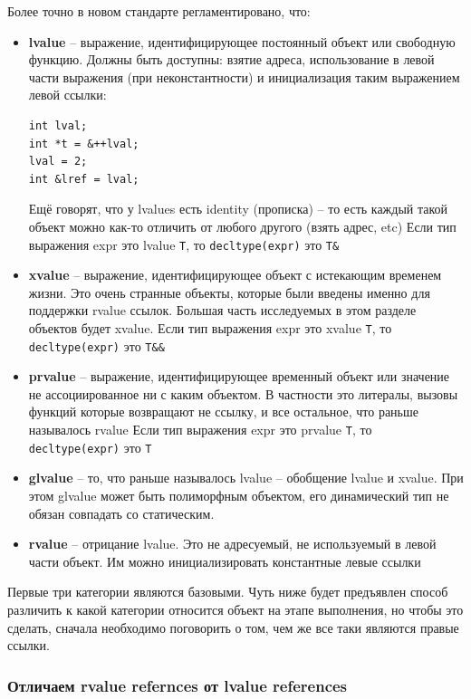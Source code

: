 \documentclass[a4paper,12pt,oneside]{article}
\begin{document}
Более точно в новом стандарте регламентировано, что:

\begin{itemize}
\item \textbf{lvalue} -- выражение, идентифицирующее постоянный объект или свободную функцию. Должны быть доступны: взятие адреса, использование в левой части выражения (при неконстантности) и инициализация таким выражением левой ссылки:
\begin{lstlisting}
int lval;
int *t = &++lval;
lval = 2;
int &lref = lval;
\end{lstlisting}
Ещё говорят, что у lvalues есть identity (прописка) -- то есть каждый такой объект можно как-то отличить от любого другого (взять адрес, etc)
Если тип выражения expr это lvalue \lstinline!T!, то \lstinline!decltype(expr)! это \lstinline!T&!
\item \textbf{xvalue} -- выражение, идентифицирующее объект с истекающим временем жизни. Это очень странные объекты, которые были введены именно для поддержки rvalue ссылок. Большая часть исследуемых в этом разделе объектов будет xvalue.
Если тип выражения expr это xvalue \lstinline!T!, то \lstinline!decltype(expr)! это \lstinline!T&&!
\item \textbf{prvalue} -- выражение, идентифицирующее временный объект или значение не ассоциированное ни с каким объектом. В частности это литералы, вызовы функций которые возвращают не ссылку, и все остальное, что раньше называлось rvalue
Если тип выражения expr это prvalue \lstinline!T!, то \lstinline!decltype(expr)! это \lstinline!T!
\item \textbf{glvalue} -- то, что раньше называлось lvalue -- обобщение lvalue и xvalue. При этом glvalue может быть полиморфным объектом, его динамический тип не обязан совпадать со статическим.
\item \textbf{rvalue} -- отрицание lvalue. Это не адресуемый, не используемый в левой части объект. Им можно инициализировать константные левые ссылки
\end{itemize}

Первые три категории являются базовыми. Чуть ниже будет предъявлен способ различить к какой категории относится объект на этапе выполнения, но чтобы это сделать, сначала необходимо поговорить о том, чем же все таки являются правые ссылки.

\subsubsection{Отличаем rvalue refernces от lvalue references}\label{RvalueRefs}
\end{document}
